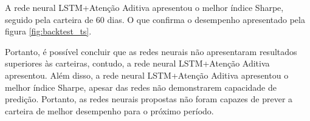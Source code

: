         \ipar A rede neural \acrshort{LSTM}+Atenção Aditiva apresentou o melhor índice Sharpe, seguido pela carteira de 60 dias. O que confirma o desempenho apresentado pela figura \ref{fig:backtest_ts}. 

        \ipar Portanto, é possível concluir que as redes neurais não apresentaram resultados superiores às carteiras, contudo, a rede neural \acrshort{LSTM}+Atenção Aditiva apresentou. Além disso, a rede neural \acrshort{LSTM}+Atenção Aditiva apresentou o melhor índice Sharpe, apesar das redes não demonstrarem capacidade de predição. Portanto, as redes neurais propostas não foram capazes de prever a carteira de melhor desempenho para o próximo período.
 
\pagebreak
